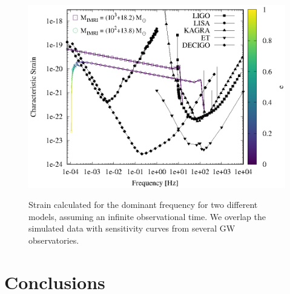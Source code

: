\documentclass[twocolumn]{aastex62}
\begin{document}
\begin{figure}
\centering
\includegraphics[width=\columnwidth]{example_signal}\\
\caption{Strain calculated for the dominant frequency for two different models, assuming an infinite observational time. We overlap the simulated data with sensitivity curves from several GW observatories.}
\label{F12}
\end{figure}

\section{Conclusions}
\end{document}
